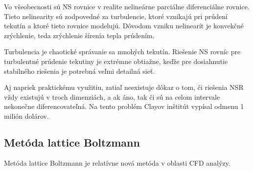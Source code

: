 \documentclass[]{tukediphc}
\begin{document}
%
%
%
%
%

Vo všeobecnosti sú NS rovnice v realite nelineárne parciálne diferenciálne rovnice. Tieto nelinearity sú zodpovedné za turbulencie, ktoré vznikajú pri prúdení tekutín a ktoré tieto rovnice modelujú. Dôvodom vzniku nelinearít je konvekčné zrýchlenie, teda zrýchlenie šírenia tepla prúdením. 

Turbulencia je chaotické správanie sa mnohých tekutín. Riešenie NS rovníc pre turbulentné prúdenie tekutiny je extrémne obtiažne, keďže pre dosiahnutie stabilného riešenia je potrebná veľmi detailná sieť. 

Aj napriek praktickému využitiu, zatiaľ neexistuje dôkaz o tom, či riešenia NSR vždy existujú v troch dimenziách, a ak áno, tak či sú na celom intervale nekonečne diferencovateľná. Na tento problém Clayov inštitút vypísal odmenu 1 milión dolárov.

\subsection{Metóda lattice Boltzmann}

Metóda lattice Boltzmann je relatívne nová metóda v oblasti CFD analýzy.
\end{document}
